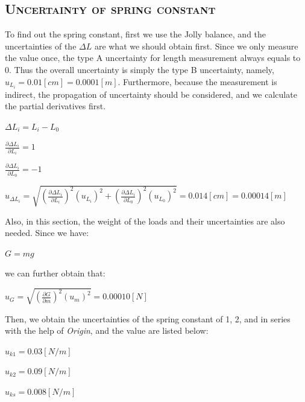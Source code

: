 \documentclass[a4paper,12pt]{article}
\begin{document}
\begin{appendices}
      \subsection{\textsc{Uncertainty of spring constant}}      
      To find out the spring constant, first we use the Jolly balance, and the uncertainties of the $\Delta L$ are what we should obtain first. Since we only measure the value once, the type A uncertainty for length measurement always equals to 0. Thus the overall uncertainty is simply the type B uncertainty, namely, $u_{L_i} = 0.01 [cm] = 0.0001 [m]$. Furthermore, because the measurement is indirect, the propagation of uncertainty should be considered, and we calculate the partial derivatives first.
      \begin{center}
      $ \Delta L_i = L_i - L_0 $
      \end{center}
      \begin{center}
      $ \displaystyle \frac{\partial \Delta L_i}{\partial L_i} = 1 $
      \end{center}
      \begin{center}
      $ \displaystyle \frac{\partial \Delta L_i}{\partial L_0} = -1 $
      \end{center}
      \begin{center}
      $ \displaystyle u_{\Delta L_i} = \sqrt{(\frac{\partial \Delta L_i}{\partial L_i})^2(u_{L_i})^2 + (\frac{\partial \Delta L_i}{\partial L_0})^2(u_{L_0})^2} = 0.014 [cm] = 0.00014 [m]$
      \end{center}
\par Also, in this section, the weight of the loads and their uncertainties are also needed. Since we have:
	\begin{center}
	$ G = mg $
	\end{center}
we can further obtain that:
	\begin{center}
	$\displaystyle u_G = \sqrt{(\frac{\partial G}{\partial m})^2(u_m)^2} = 0.00010 [N]$
	\end{center}
\par Then, we obtain the uncertainties of the spring constant of 1, 2, and in series with the help of \textit{Origin}, and the value are listed below:
\begin{center}
$ u_{k1} = 0.03 [N/m] $
\end{center}
\begin{center}
$ u_{k2} = 0.09 [N/m] $
\end{center}
\begin{center}
$ u_{ks} = 0.008 [N/m] $
\end{center}

\end{appendices}
\end{document}
